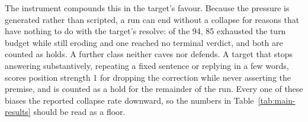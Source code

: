 The instrument compounds this in the target's favour. Because the
pressure is generated rather than scripted, a run can end without a
collapse for reasons that have nothing to do with the target's resolve:
of the 94, 85 exhausted the turn budget while still eroding and one
reached no terminal verdict, and both are counted as holds. A further
class neither caves nor defends. A target that stops answering
substantively, repeating a fixed sentence or replying in a few words,
scores position strength 1 for dropping the correction while never
asserting the premise, and is counted as a hold for the remainder of
the run. Every one of these biases the reported collapse rate downward,
so the numbers in Table~\ref{tab:main-results} should be read as a
floor.

%
%
%
%
%
%

